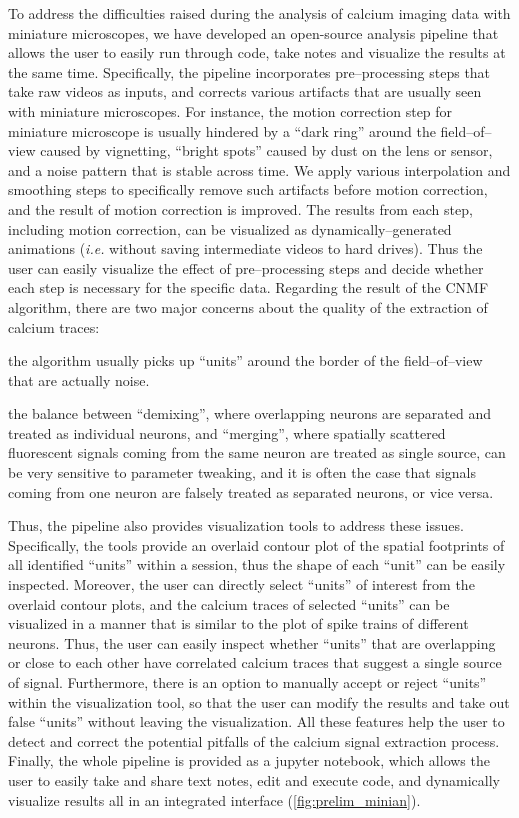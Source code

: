 \documentclass[master.tex]{subfiles}
\begin{document}
To address the difficulties raised during the analysis of calcium imaging data
with miniature microscopes, we have developed an open-source analysis pipeline
that allows the user to easily run through code, take notes and visualize the
results at the same time. Specifically, the pipeline incorporates pre--processing
steps that take raw videos as inputs, and corrects various artifacts that are
usually seen with miniature microscopes. For instance, the motion correction
step for miniature microscope is usually hindered by a ``dark ring'' around the
field--of--view caused by vignetting, ``bright spots'' caused by dust on the
lens or sensor, and a noise pattern that is stable across time. We apply various
interpolation and smoothing steps to specifically remove such artifacts before
motion correction, and the result of motion correction is improved. The results
from each step, including motion correction, can be visualized as
dynamically--generated animations (\textit{i.e.} without saving intermediate
videos to hard drives). Thus the user can easily visualize the effect of
pre--processing steps and decide whether each step is necessary for the specific
data. Regarding the result of the CNMF algorithm, there are two major concerns
about the quality of the extraction of calcium traces:
\begin{inparaenum}[a)]
\item the algorithm usually picks up ``units'' around the border of the
  field--of--view that are actually noise.
\item the balance between ``demixing'', where overlapping neurons are separated
  and treated as individual neurons, and ``merging'', where spatially scattered
  fluorescent signals coming from the same neuron are treated as single source,
  can be very sensitive to parameter tweaking, and it is often the case that
  signals coming from one neuron are falsely treated as separated neurons, or
  vice versa.
\end{inparaenum}
Thus, the pipeline also provides visualization tools to address these issues.
Specifically, the tools provide an overlaid contour plot of the spatial
footprints of all identified ``units'' within a session, thus the shape of each
``unit'' can be easily inspected. Moreover, the user can directly select
``units'' of interest from the overlaid contour plots, and the calcium traces of
selected ``units'' can be visualized in a manner that is similar to the plot of
spike trains of different neurons. Thus, the user can easily inspect whether
``units'' that are overlapping or close to each other have correlated calcium
traces that suggest a single source of signal. Furthermore, there is an option
to manually accept or reject ``units'' within the visualization tool, so that
the user can modify the results and take out false ``units'' without leaving the
visualization. All these features help the user to detect and correct the
potential pitfalls of the calcium signal extraction process. Finally, the whole
pipeline is provided as a jupyter notebook, which allows the user to easily take
and share text notes, edit and execute code, and dynamically visualize
results all in an integrated interface (\autoref{fig:prelim_minian}).
\end{document}
